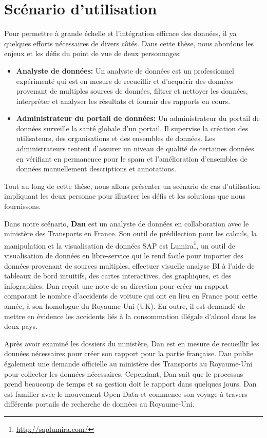 \documentclass[a4paper,11pt,twoside]{ThesisStyle}
\begin{document}
\section{Scénario d'utilisation}\label{section:scenario}

Pour permettre à grande échelle et l'intégration efficace des données, il ya quelques efforts nécessaires de divers côtés. Dans cette thèse, nous abordons les enjeux et les défis du point de vue de deux personnages:

\begin{itemize}
	\item \textbf{Analyste de données:} Un analyste de données est un professionnel expérimenté qui est en mesure de recueillir et d'acquérir des données provenant de multiples sources de données, filtrer et nettoyer les données, interpréter et analyser les résultats et fournir des rapports en cours.
	\item \textbf{Administrateur du portail de données:} Un administrateur du portail de données surveille la santé globale d'un portail. Il supervise la création des utilisateurs, des organisations et des ensembles de données. Les administrateurs tentent d'assurer un niveau de qualité de certaines données en vérifiant en permanence pour le spam et l'amélioration d'ensembles de données manuellement descriptions et annotations.
\end{itemize}

Tout au long de cette thèse, nous allons présenter un scénario de cas d'utilisation impliquant les deux personae pour illustrer les défis et les solutions que nous fournissons.

Dans notre scénario, \textbf{Dan} est un analyste de données en collaboration avec le ministère des Transports en France. Son outil de prédilection pour les calculs, la manipulation et la visualisation de données SAP est Lumira\footnote{\url{http://saplumira.com/}}, un outil de visualisation de données en libre-service qui le rend facile pour importer des données provenant de sources multiples, effectuer visuelle analyse BI à l'aide de tableaux de bord intuitifs, des cartes interactives, des graphiques, et des infographies. Dan reçoit une note de sa direction pour créer un rapport comparant le nombre d'accidents de voiture qui ont eu lieu en France pour cette année, à son homologue du Royaume-Uni (UK). En outre, il est demandé de mettre en évidence les accidents liés à la consommation illégale d'alcool dans les deux pays.

Après avoir examiné les dossiers du ministère, Dan est en mesure de recueillir les données nécessaires pour créer son rapport pour la partie française. Dan publie également une demande officielle au ministère des Transports au Royaume-Uni pour collecter les données nécessaires. Cependant, Dan sait que le processus prend beaucoup de temps et sa gestion doit le rapport dans quelques jours. Dan est familier avec le mouvement Open Data et commence son voyage à travers différents portails de recherche de données au Royaume-Uni.
\end{document}
